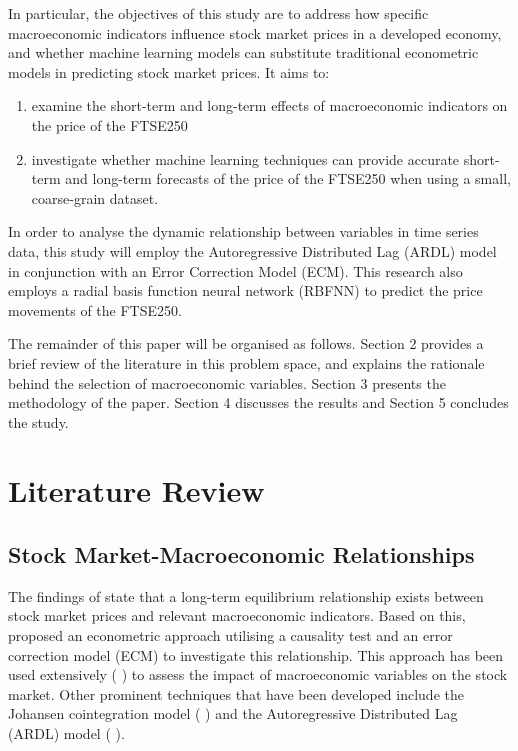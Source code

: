 \documentclass[11pt,a4paper]{article}
\newcommand{\citeboth}[1]{\citeauthor{#1} \citep{#1}}
\begin{document}
In particular, the objectives of this study are to address how specific macroeconomic indicators influence stock market prices in a developed economy, and whether machine learning models can substitute traditional econometric models in predicting stock market prices. It aims to:
\begin{enumerate}
    \item examine the short-term and long-term effects of macroeconomic indicators on the price of the FTSE250
    \item investigate whether machine learning techniques can provide accurate short-term and long-term forecasts of the price of the FTSE250 when using a small, coarse-grain dataset.
\end{enumerate}

In order to analyse the dynamic relationship between variables in time series data, this study
will employ the Autoregressive Distributed Lag (ARDL) model in conjunction with an Error
Correction Model (ECM). This research also employs a radial basis function neural network
(RBFNN) to predict the price movements of the FTSE250.

The remainder of this paper will be organised as follows. 
Section 2 provides a brief review of the literature in this problem space, and explains the rationale behind the selection of macroeconomic variables.
Section 3 presents the methodology of the paper. Section 4 discusses the results and Section 5 concludes
the study.

\section{Literature Review}
\label{sec:lit}

\subsection{Stock Market-Macroeconomic Relationships}

The findings of \citeboth{ChenRollRoss1986} state that a long-term equilibrium relationship 
exists between stock market prices and relevant macroeconomic indicators. Based on this, 
\citeboth{EngleGranger1987} proposed an econometric approach utilising a causality test and an 
error correction model (ECM) to investigate this relationship. This approach has been used extensively (\citeboth{QuadriMasih, Plíhal2016,olomu2015}) to assess the impact of macroeconomic variables on the stock market. 
Other prominent techniques that have been developed include the Johansen cointegration model (\citeboth{YadavKheraMishra2021,Ozcan2012,ChistiShakeelGanai2020}) and the Autoregressive Distributed Lag (ARDL) model (\citeboth{khan2018,demir2019,neifar2023}).
\end{document}
